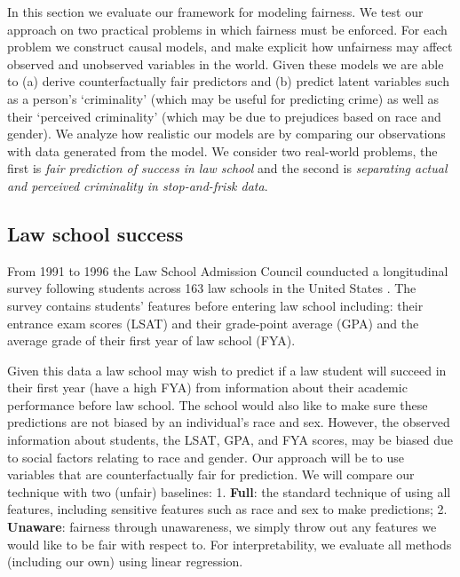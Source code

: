 In this section we evaluate our framework for modeling fairness. We test our approach on two practical problems in which fairness must be enforced. For each problem we construct causal models, and make explicit how unfairness may affect observed and unobserved variables in the world. Given these models we are able to (a) derive counterfactually fair predictors and (b) predict latent variables such as a person's `criminality' (which may be useful for predicting crime) as well as their `perceived criminality' (which may be due to prejudices based on race and gender). We analyze how realistic our models are by comparing our observations with data generated from the model. We consider two real-world problems, the first is \emph{fair prediction of success in law school} and the second is \emph{separating actual and perceived criminality in stop-and-frisk data}.

\subsection{Law school success}
\label{sec:law-school-success}
From 1991 to 1996 the Law School Admission Council
counducted a longitudinal survey following students across 163 law
schools in the United States \cite{wightman1998lsac}. %
The survey contains students' features before entering law school
including: their entrance exam scores (LSAT) and their grade-point
average (GPA) and the average grade of their first year of law school
(FYA). %

Given this data a law school may wish to predict if a law student
will succeed in their first year (have a high FYA) from information about their academic performance 
before law school. The school would also like to make sure
these predictions are not biased by an individual's race and
sex. However, the observed information about
students, the LSAT, GPA, and FYA scores,  may be biased due to 
social factors relating to race and gender. Our approach will be to use variables that are counterfactually fair for prediction. We will compare our technique with two (unfair) baselines: 1. \textbf{Full}: the standard technique of using all features, including sensitive features such as race and sex to make predictions; 2. \textbf{Unaware}: fairness through unawareness, we simply throw out any features we would like to be fair with respect to. For interpretability, we evaluate all methods (including our own) using linear regression.


